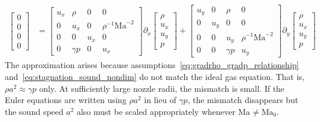 \documentclass[letterpaper,11pt,nointlimits,reqno]{amsart}
\newcommand{\Mach}[1][]{\mbox{Ma}_{#1}}
\begin{document}
\begin{align}
  \begin{bmatrix} 0 \\ 0 \\ 0 \\ 0 \end{bmatrix}
&=
  \begin{bmatrix}
     u_x  &  \rho      &  0    &  0                    \\
     0    &  u_x       &  0    &  \rho^{-1}\Mach^{-2}  \\
     0    &  0         &  u_x  &  0                    \\
     0    &  \gamma{}p &  0    &  u_x
  \end{bmatrix}
  \partial_x
  \begin{bmatrix} \rho \\ u_x \\ u_y \\ p \end{bmatrix}
+
  \begin{bmatrix}
     u_y  &  0    &  \rho       &  0                    \\
     0    &  u_y  &  0          &  0                    \\
     0    &  0    &  u_y        &  \rho^{-1}\Mach^{-2}  \\
     0    &  0    &  \gamma{}p  &  u_y
  \end{bmatrix}
  \partial_y
  \begin{bmatrix} \rho \\ u_x \\ u_y \\ p \end{bmatrix}
\end{align}
%
The approximation arises because
assumptions~\eqref{eq:gradrho_gradp_relationship}
and~\eqref{eq:stagnation_sound_nondim} do not match the ideal gas equation.
That is, $\rho a^2 \approx \gamma p$ only.  At sufficiently large nozzle radii,
the mismatch is small.  If the Euler equations are written using $\rho a^2$ in
lieu of $\gamma p$, the mismatch disappears but the sound speed $a^2$ also must
be scaled appropriately whenever $\Mach\neq\Mach[0]$.
\end{document}
